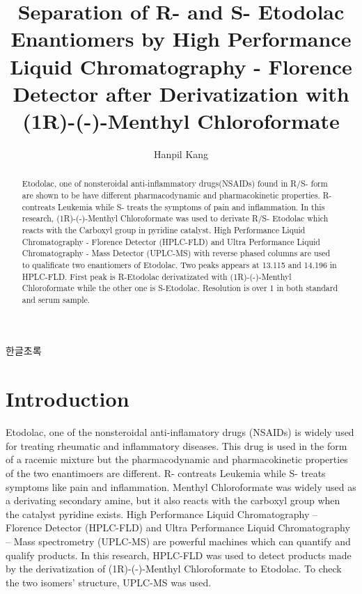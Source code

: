 \documentclass[12pt]{article} %
\title{Separation of R- and S- Etodolac Enantiomers by High Performance Liquid Chromatography - Florence Detector after Derivatization with (1R)-(-)-Menthyl Chloroformate}
\author{Hanpil Kang}
\date{} %
\begin{document}
\setcounter{page}{1}

\maketitle

\begin{abstract}
Etodolac, one of nonsteroidal anti-inflammatory drugs(NSAIDs) found in R/S- form are shown to be have different pharmacodynamic and pharmacokinetic properties. R- contreats Leukemia while S- treats the symptoms of pain and inflammation. In this research, (1R)-(-)-Menthyl Chloroformate was used to derivate R/S- Etodolac which reacts with the Carboxyl group in pyridine catalyst. High Performance Liquid Chromatography - Florence Detector (HPLC-FLD) and Ultra Performance Liquid Chromatography - Mass Detector (UPLC-MS) with reverse phased columns are used to qualificate two enantiomers of Etodolac. Two peaks appears at 13.115 and 14.196 in HPLC-FLD. First peak is R-Etodolac derivatizated with (1R)-(-)-Menthyl Chloroformate while the other one is S-Etodolac. Resolution is over 1 in both standard and serum sample.  
\end{abstract}

\newpage

한글초록

\newpage

\tableofcontents

\newpage

\listoffigures

\newpage

\listoftables

\newpage



\setcounter{page}{1}

\section{Introduction}

Etodolac, one of the nonsteroidal anti-inflamatory drugs (NSAIDs) is widely used for treating rheumatic and inflammatory diseases. This drug is used in the form of a racemic mixture but the pharmacodynamic and pharmacokinetic properties of the two enantimoers are different. R- contreats Leukemia\cite{cite1} while S- treats symptoms like pain and inflammation. Menthyl Chloroformate was widely used as a derivating secondary amine, but it also reacts with the carboxyl group when the catalyst pyridine exists.
High Performance Liquid Chromatography – Florence Detector (HPLC-FLD) and Ultra Performance Liquid Chromatography – Mass spectrometry (UPLC-MS) are powerful machines which can quantify and qualify products. 
In this research, HPLC-FLD was used to detect products made by the derivatization of (1R)-(-)-Menthyl Chloroformate to Etodolac. To check the two isomers' structure, UPLC-MS was used.
\end{document}

